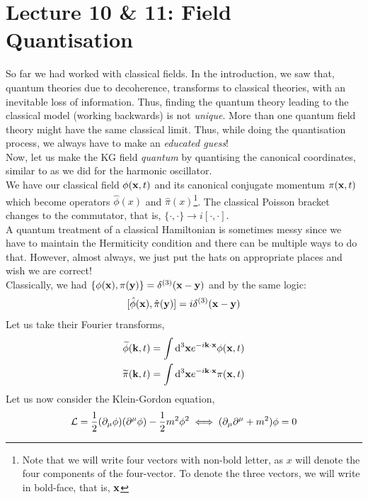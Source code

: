 
\section*{Lecture 10 \& 11: Field Quantisation}

So far we had worked with classical fields. In the introduction, we saw that, quantum theories due to decoherence, transforms to classical theories, with an inevitable loss of information. Thus, finding the quantum theory leading to the classical model (working backwards) is not \textit{unique}. More than one quantum field theory might have the same classical limit. Thus, while doing the quantisation process, we always have to make an \textit{educated guess}!\\[0.2cm]
 Now, let us make the KG field \textit{quantum} by quantising the canonical coordinates, similar to as we did for the harmonic oscillator.\\[0.2cm]
We have our classical field $\phi(\vb{{x}}, t)$ and its canonical conjugate momentum $\pi(\vb{{x}},t)$ which become operators $\hat{\phi}(x)$ and $\hat{\pi}(x)$\footnote{Note that we will write four vectors with non-bold letter, as $x$ will denote the four components of the four-vector. To denote the three vectors, we will write in bold-face, that is, $\vb{{x}}$ }. The classical Poisson bracket changes to the commutator, that is, $\{\cdot, \cdot\}\rightarrow i[\cdot,\cdot]$. \\[0.2cm]
A quantum treatment of a classical Hamiltonian is sometimes messy since we have to maintain the Hermiticity condition and there can be multiple ways to do that. However, almost always, we just put the hats on appropriate places and wish we are correct! \\[0.2cm]
Classically, we had $\{\phi(\vb{{x}}), \pi(\vb{{y}})\} = \delta^{(3)}(\vb{{x}}-\vb{{y}})$ and by the same logic:
\[ [\hat{\phi}(\vb{{x}}), \hat{\pi}(\vb{{y}})] = i\delta^{(3)}(\vb{{x}}-\vb{{y}})\]Let us take their Fourier transforms,
\begin{align*}
    \widetilde{\phi}(\vb{{k}},t) &= \int \dd^3\vb{{x}} e^{-i \vb{{k}}\cdot \vb{{x}}} \phi(\vb{{x}},t)\\
    \widetilde{\pi}(\vb{{k}},t) &= \int \dd^3\vb{{x}} e^{-i \vb{{k}}\cdot \vb{{x}}} \pi(\vb{{x}},t)
\end{align*}
Let us now consider the Klein-Gordon equation,
$$\mathcal L = \frac{1}{2}(\partial_\mu \phi) (\partial^\mu \phi )- \frac{1}{2}m^2\phi^2 \iff (\partial_\mu \partial^\mu + m^2)\phi = 0$$
